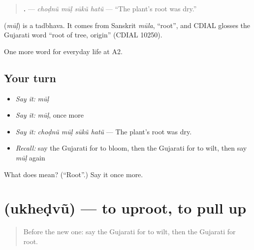 \begin{quote}
\textbf{   .} — \emph{choḍnũ mūḷ sūkũ hatũ} — \textquotedblleft{}The plant's root was dry.\textquotedblright{}
\end{quote}

\begin{cousinweb}
\textbf{} (\emph{mūḷ}) is a tadbhava. It comes from Sanskrit \emph{mūla}, \textquotedblleft{}root\textquotedblright{}, and CDIAL glosses the Gujarati word \textquotedblleft{}root of tree, origin\textquotedblright{} (CDIAL 10250).
\end{cousinweb}

\begin{grammarlens}[title={What you've built}]
One more word for everyday life at A2.
\end{grammarlens}

\subsection*{Your turn}
\begin{itemize}
\raggedright
  \item \emph{Say it:} \emph{mūḷ}
  \item \emph{Say it:} \emph{mūḷ}, once more
  \item \emph{Say it:} \emph{choḍnũ mūḷ sūkũ hatũ} — The plant's root was dry.
  \item \emph{Recall:} say the Gujarati for to bloom, then the Gujarati for to wilt, then say \emph{mūḷ} again
\end{itemize}

\begin{tcolorbox}[breakable,colback=teal!4,colframe=teal!35!black,title={Before you move on}]
What does  mean? (\textquotedblleft{}Root\textquotedblright{}.) Say it once more.
\end{tcolorbox}
\section[\texorpdfstring{\gu{ઉખેડવું} (ukheḍvũ)}{ઉખેડવું (ukheḍvũ)}]{ (ukheḍvũ) — to uproot, to pull up}

\label{lesson:GU-C241-ukhedvu}



\begin{quote}
Before the new one: say the Gujarati for to wilt, then the Gujarati for root.
\end{quote}

